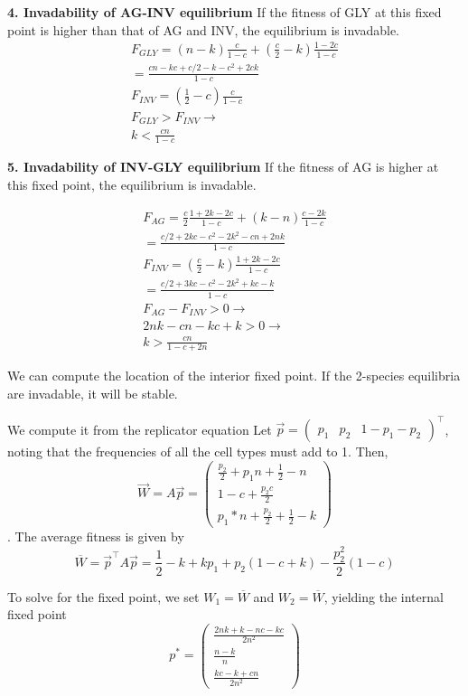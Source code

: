 \documentclass[12pt]{report}
\begin{document}
\textbf{4. Invadability of AG-INV equilibrium}
If the fitness of GLY at this fixed point is higher than that of AG and INV, the equilibrium is invadable. 
\begin{gather*}
F_{GLY} = (n - k) \frac{c}{1-c} + (\frac{c}{2} - k) \frac{1 - 2c}{1 -c} \\
 = \frac{cn - kc + c / 2 - k - c^2 + 2ck}{1 -c} \\
F_{INV} = (\frac{1}{2} - c) \frac{c}{1 -c} \\
F_{GLY} > F_{INV} \rightarrow \\
k < \frac{cn}{1-c}
\end{gather*}

\textbf{5. Invadability of INV-GLY equilibrium}
If the fitness of AG is higher at this fixed point, the equilibrium is invadable. 

\begin{gather*}
F_{AG} = \frac{c}{2} \frac{1 + 2 k  - 2 c}{1 - c} + (k - n) \frac{c - 2k}{1-c} \\
 = \frac{c / 2 + 2 k c - c^2 - 2 k ^2 - c n + 2n k}{1 - c} \\
F_{INV} = (\frac{c}{2} - k) \frac{1 + 2 k - 2 c}{1 -c}  \\
= \frac{c / 2 + 3 k c - c ^ 2 - 2 k ^2 + k c - k}{1 - c}  \\
F_{AG} - F_{INV} > 0 \rightarrow \\
2 n k - c n - k c + k > 0 \rightarrow \\ 
k > \frac{cn}{1 - c + 2n}
\end{gather*}


We can compute the location of the interior fixed point. If the 2-species equilibria are invadable, it will be stable. 

We compute it from the replicator equation
Let $\vec{p} = { \begin{pmatrix} p_1 & p_2 & 1-p_1-p_2 \end{pmatrix}}^\top$, noting that the frequencies of all the cell types must add to 1. Then, $$\vec{W} = A\vec{p} = 
{\begin{pmatrix} \frac{p_2}{2} + p_1 n + \frac{1}{2}-n\\
1-c + \frac{p_2 c}{2}\\ %
p_1*n+\frac{p_2}{2} + \frac{1}{2}-k \end{pmatrix}}$$. The average fitness is given by  $$\overline{W} = \vec{p}^\top A \vec{p} = \frac{1}{2}-k+ k p_1 + p_2 (1 - c + k) - \frac{p_2^2}{2} (1-c) $$

To solve for the fixed point, we set $W_1 = \overline{W}$ and $W_2 = \overline{W}$, yielding the internal fixed point 
$$p^* = {\begin{pmatrix}\displaystyle{\frac{2 n k + k - n c - k c}{2n^2}}\\
		\displaystyle{\frac{n-k}{n}}\\
		\displaystyle{\frac{k c - k + c n}{2n^2}}
		\end{pmatrix}}$$
		
\end{document}
